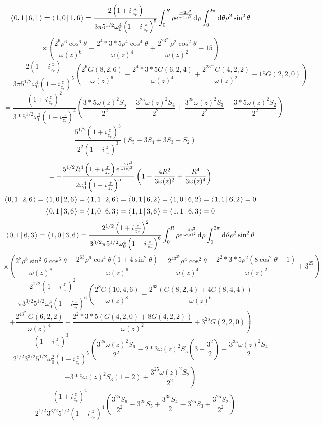 \documentclass[11pt]{amsart}
\makeatletter
\newcommand{\e}{{\rm e}}				%
\newcommand{\msp}[1]{\mspace{#1mu}}		%
\newcommand{\0}{\varnothing}		%
\newcommand{\dd}{\msp{1} {\rm{d}} \msp{1}}	%
\newcommand{\brac}[2]{\left\langle\msp{2} #1\left\lvert \msp{3.5} #2 \right.\right\rangle}	%
\newcommand{\1}{!}
\newcommand{\2}{@}
\newcommand{\3}{\#}
\newcommand{\4}{\$}
\newcommand{\5}{\%}
\newcommand{\6}{$^\wedge$}
\newcommand{\7}{\&}
\newcommand{\8}{*}
\newcommand{\9}{(}
\makeatother
\begin{document}
\[
\brac{0,1}{6,1} =\brac{1,0}{1,6} = \frac{2\left(1+i\frac{z}{z_r}\right)}{3\pi5^{1/2}\omega_0^4\left(1-i\frac{z}{z_r}\right)^5}\int_0^R\rho \e^{\frac{-2\rho^2}{\omega(z)^2}}\dd \rho \int_0^{2\pi} \dd \theta\rho^2\sin^2\theta
\]
\[
\times \left(\frac{2^6\rho^6\cos^6\theta}{\omega(z)^6}-\frac{2^4*3*5\rho^4\cos^4\theta}{\omega(z)^4}+\frac{2^23^25\rho^2\cos^2\theta}{\omega(z)^2}-15\right)
\]
\[
=\frac{2\left(1+i\frac{z}{z_r}\right)}{3\pi5^{1/2}\omega_0^4\left(1-i\frac{z}{z_r}\right)^5}\left(\frac{2^6G(8,2,6)}{\omega(z)^6}-\frac{2^4*3*5G(6,2,4)}{\omega(z)^4}+\frac{2^23^25G(4,2,2)}{\omega(z)^2}-15G(2,2,0)\right)
\]
\[
=\frac{\left(1+i\frac{z}{z_r}\right)^2}{3*5^{1/2}\omega_0^2\left(1-i\frac{z}{z_r}\right)^4}\left(\frac{3*5\omega(z)^2S_5}{2^2}-\frac{3^25\omega(z)^2S_4}{2^2}+\frac{3^25\omega(z)^2S_3}{2^2}-\frac{3*5\omega(z)^2S_2}{2^2}\right)
\]
\[
=\frac{5^{1/2}\left(1+i\frac{z}{z_r}\right)^3}{2^2\left(1-i\frac{z}{z_r}\right)^3}\left(S_5-3S_4+3S_3-S_2\right)
\]
\[
=-\frac{5^{1/2}R^4\left(1+i\frac{z}{z_r}\right)\e^{\frac{-2R^2}{\omega(z)^2}}}{2\omega_0^4\left(1-i\frac{z}{z_r}\right)^5}\left(1-\frac{4R^2}{3\omega(z)^2}+\frac{R^4}{3\omega(z)^4}\right)
\]
\[
\brac{0,1}{2,6} = \brac{1,0}{2,6} = \brac{1,1}{2,6} = \brac{0,1}{6,2} = \brac{1,0}{6,2} = \brac{1,1}{6,2} = 0
\]
\[
\brac{0,1}{3,6} = \brac{1,0}{6,3} = \brac{1,1}{3,6} = \brac{1,1}{6,3} = 0
\]
\[
\brac{0,1}{6,3} = \brac{1,0}{3,6} = \frac{2^{1/2}\left(1+i\frac{z}{z_r}\right)^2}{3^{3/2}\pi5^{1/2}\omega_0^4\left(1-i\frac{z}{z_r}\right)^6}\int_0^R\rho \e^{\frac{-2\rho^2}{\omega(z)^2}}\dd \rho \int_0^{2\pi} \dd \theta \rho^2\sin^2\theta
\]
\[
\times\left(\frac{2^8\rho^8\sin^2\theta\cos^6\theta}{\omega(z)^8}-\frac{2^63\rho^6\cos^4\theta\left(1+4\sin^2\theta\right)}{\omega(z)^6}+\frac{2^43^25\rho^4\cos^2\theta}{\omega(z)^4}-\frac{2^2*3*5\rho^2\left(8\cos^2\theta+1\right)}{\omega(z)^2}+3^25\right)
\]
\[
=\frac{2^{1/2}\left(1+i\frac{z}{z_r}\right)^2}{\pi3^{3/2}5^{1/2}\omega_0^4\left(1-i\frac{z}{z_r}\right)^6}\left(\frac{2^8G(10,4,6)}{\omega(z)^8}-\frac{2^63\left(G(8,2,4)+4G(8,4,4)\right)}{\omega(z)^6}\right.
\]
\[
\left.+\frac{2^43^25G(6,2,2)}{\omega(z)^4}-\frac{2^2*3*5\left(G(4,2,0)+8G(4,2,2)\right)}{\omega(z)^2}+3^25G(2,2,0)\right)
\]
\[
=\frac{\left(1+i\frac{z}{z_r}\right)^3}{2^{1/2}3^{3/2}5^{1/2}\omega_0^2\left(1-i\frac{z}{z_r}\right)^5}\left(\frac{3^25\omega(z)^2S_6}{2^2}-2*3\omega(z)^2S_5\left(3+\frac{3^2}{2}\right)+\frac{3^35\omega(z)^2S_4}{2}\right.
\]
\[
\left.-3*5\omega(z)^2S_3\left(1+2\right)+\frac{3^25\omega(z)^2S_2}{2^2}\right)
\]
\[
=\frac{\left(1+i\frac{z}{z_r}\right)^4}{2^{1/2}3^{3/2}5^{1/2}\left(1-i\frac{z}{z_r}\right)^4}\left(\frac{3^25S_6}{2^2}-3^25S_5+\frac{3^35S_4}{2}-3^25S_3+\frac{3^25S_2}{2^2}\right)
\]
\end{document}
